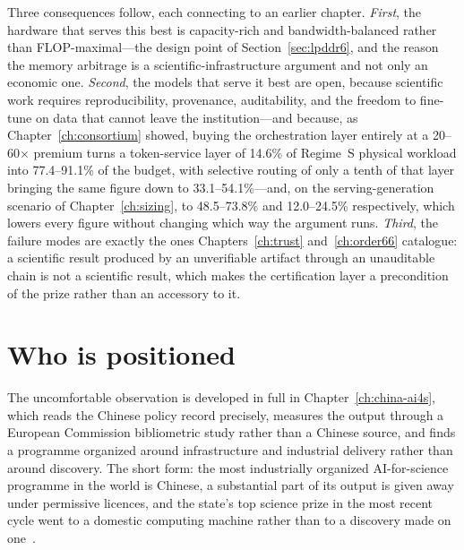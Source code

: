 Three consequences follow, each connecting to an earlier chapter. \emph{First}, the hardware that serves this best is capacity-rich and bandwidth-balanced rather than FLOP-maximal---the design point of Section~\ref{sec:lpddr6}, and the reason the memory arbitrage is a scientific-infrastructure argument and not only an economic one. \emph{Second}, the models that serve it best are open, because scientific work requires reproducibility, provenance, auditability, and the freedom to fine-tune on data that cannot leave the institution---and because, as Chapter~\ref{ch:consortium} showed, buying the orchestration layer entirely at a 20--60$\times$ premium turns a token-service layer of 14.6\% of Regime~S physical workload into 77.4--91.1\% of the budget, with selective routing of only a tenth of that layer bringing the same figure down to 33.1--54.1\%---and, on the serving-generation scenario of Chapter~\ref{ch:sizing}, to 48.5--73.8\% and 12.0--24.5\% respectively, which lowers every figure without changing which way the argument runs. \emph{Third}, the failure modes are exactly the ones Chapters~\ref{ch:trust} and~\ref{ch:order66} catalogue: a scientific result produced by an unverifiable artifact through an unauditable chain is not a scientific result, which makes the certification layer a precondition of the prize rather than an accessory to it.

\section{Who is positioned}

The uncomfortable observation is developed in full in Chapter~\ref{ch:china-ai4s}, which reads the Chinese policy record precisely, measures the output through a European Commission bibliometric study rather than a Chinese source, and finds a programme organized around infrastructure and industrial delivery rather than around discovery. The short form: the most industrially organized AI-for-science programme in the world is Chinese, a substantial part of its output is given away under permissive licences, and the state's top science prize in the most recent cycle went to a domestic computing machine rather than to a discovery made on one~\cite{ec-ai4s-biblio,pengcheng-cloudbrain}.

